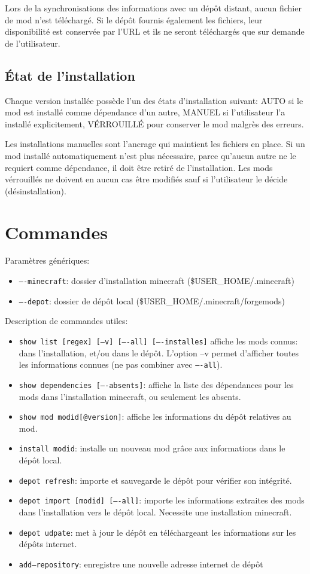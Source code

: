 \documentclass{article}
\begin{document}
Lors de la synchronisations des informations avec un dépôt distant, aucun fichier de mod n'est téléchargé.
Si le dépôt fournis également les fichiers, leur disponibilité est conservée par l'URL et ils ne seront téléchargés que sur demande de l'utilisateur.

\subsection{État de l'installation}
Chaque version installée possède l'un des états d'installation suivant: AUTO si le mod est installé comme dépendance d'un autre, MANUEL si l'utilisateur l'a installé explicitement, VÉRROUILLÉ pour conserver le mod malgrès des erreurs.

Les installations manuelles sont l'ancrage qui maintient les fichiers en place.
Si un mod installé automatiquement n'est plus nécessaire, parce qu'aucun autre ne le requiert comme dépendance, il doit être retiré de l'installation.
Les mods vérrouillés ne doivent en aucun cas être modifiés sauf si l'utilisateur le décide (désinstallation).


\section{Commandes}
Paramètres génériques:
\begin{itemize}
    \item \texttt{----minecraft}: dossier d'installation minecraft (\$USER\_HOME/.minecraft)
    \item \texttt{----depot}: dossier de dépôt local (\$USER\_HOME/.minecraft/forgemods)
\end{itemize}

\medskip
Description de commandes utiles:
\begin{itemize}
    \item \texttt{show list [regex] [--v] [----all] [----installes]} affiche les mods connus: dans l'installation, et/ou dans le dépôt.
L'option --v permet d'afficher toutes les informations connues (ne pas combiner avec \texttt{----all}).
    \item \texttt{show dependencies [----absents]}: affiche la liste des dépendances pour les mods dans l'installation minecraft, ou seulement les absents.
    \item \texttt{show mod modid[@version]}: affiche les informations du dépôt relatives au mod.
    \item \texttt{install modid}: installe un nouveau mod grâce aux informations dans le dépôt local.
    \item \texttt{depot refresh}: importe et sauvegarde le dépôt pour vérifier son intégrité.
    \item \texttt{depot import [modid] [----all]}: importe les informations extraites des mods dans l'installation vers le dépôt local.
Necessite une installation minecraft.
    \item \texttt{depot udpate}: met à jour le dépôt en téléchargeant les informations sur les dépôts internet.
    \item \texttt{add--repository}: enregistre une nouvelle adresse internet de dépôt
\end{itemize}
\end{document}
